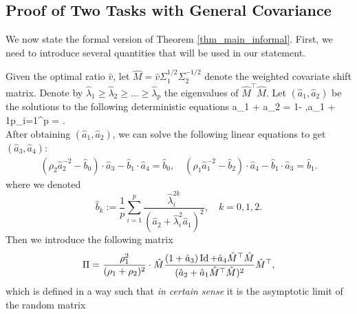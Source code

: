 \subsection{Proof of Two Tasks with General Covariance}\label{app_proof_main}


We now state the formal version of Theorem \ref{thm_main_informal}. First, we need to introduce several quantities that will be used in our statement.

Given the optimal ratio $\hat v$, let $\hat{M} = \hat{v} \Sigma_1^{1/2}\Sigma_2^{-1/2}$ denote the weighted covariate shift matrix. Denote by ${\hat\lambda}_1\ge {\hat\lambda}_2 \ge \dots \ge {\hat\lambda}_p$ the eigenvalues of $\hat{M}^{\top}\hat{M}$. Let $(\hat a_1, \hat a_2)$ be the solutions to the following deterministic equations
	\be
		 \hat a_1 +  \hat a_2 = 1- ,\quad  \hat a_1 + \cdot \frac1p\sum_{i=1}^p  = .\label{eq_a2} \\
		 \ee
		 After obtaining $(\hat a_1,\hat a_2)$, we can solve the following linear equations to get $(\hat a_3,\hat a_4)$:
\begin{gather}
		\left(\rho_2 \hat a_2^{-2}- \hat b_0\right)\cdot \hat  a_3 - \hat b_1 \cdot \hat a_4
		=\hat b_0, \quad \left(\rho_1\hat a_1^{-2} - \hat b_2  \right)\cdot \hat a_4 - \hat b_1 \cdot \hat a_3 =\hat b_1 .\label{eq_a3} 
	\end{gather}
where we denoted
$$\hat b_k:= \frac1{p}\sum_{i=1}^p \frac{\hat \lambda_i^{2k}}{ (\hat a_2 +\hat  \lambda_i^2\hat a_1)^2  },\quad k=0,1,2.$$
Then we introduce the following matrix
$$\Pi = \frac{\rho_1^2}{(\rho_1 + \rho_2)^2}\cdot{\hat M} \frac{(1 + \hat a_3)\operatorname{Id} +\hat  a_4 \hat {M}^{\top}\hat {M}}{(\hat a_2 +\hat  a_1 \hat {M}^{\top}\hat {M})^2} \hat {M}^{\top},$$
which is defined in a way such that {\it in certain sense} it is the asymptotic limit of the random matrix 
